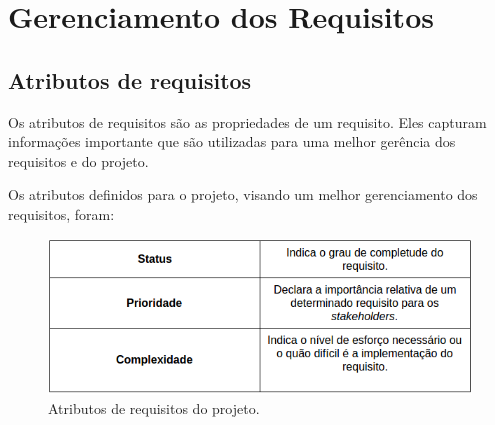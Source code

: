 \chapter[Gerenciamento dos Requisitos]{Gerenciamento dos Requisitos}

  \section{Atributos de requisitos}
  
    Os atributos de requisitos são as propriedades de um requisito. 
    Eles capturam informações importante que são utilizadas para uma melhor gerência dos requisitos e do projeto.
    
    Os atributos definidos para o projeto, visando um melhor gerenciamento dos requisitos, foram:
    
    \begin{figure}[!htbp]
      \centering
      \includegraphics[scale=0.5]{editaveis/figuras/requirements_atributes}
      \caption[Atributos de requisitos do projeto] {Atributos de requisitos do projeto. \footnotemark}
      \label{requirements_atributes}
    \end{figure}
    
